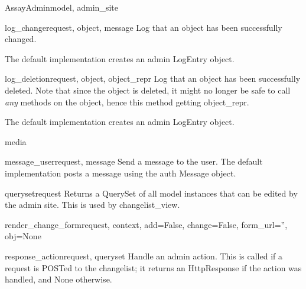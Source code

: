 \documentclass[letterpaper,10pt,english]{sphinxmanual}
\begin{document}
\begin{classdesc}{AssayAdmin}{model, admin\_site}
\hypertarget{data.admin.AssayAdmin.log_change}{}\begin{methoddesc}{log\_change}{request, object, message}
Log that an object has been successfully changed.

The default implementation creates an admin LogEntry object.
\end{methoddesc}

\hypertarget{data.admin.AssayAdmin.log_deletion}{}\begin{methoddesc}{log\_deletion}{request, object, object\_repr}
Log that an object has been successfully deleted. Note that since the
object is deleted, it might no longer be safe to call \emph{any} methods
on the object, hence this method getting object\_repr.

The default implementation creates an admin LogEntry object.
\end{methoddesc}

\hypertarget{data.admin.AssayAdmin.media}{}\begin{memberdesc}{media}\end{memberdesc}

\hypertarget{data.admin.AssayAdmin.message_user}{}\begin{methoddesc}{message\_user}{request, message}
Send a message to the user. The default implementation
posts a message using the auth Message object.
\end{methoddesc}

\hypertarget{data.admin.AssayAdmin.queryset}{}\begin{methoddesc}{queryset}{request}
Returns a QuerySet of all model instances that can be edited by the
admin site. This is used by changelist\_view.
\end{methoddesc}

\hypertarget{data.admin.AssayAdmin.render_change_form}{}\begin{methoddesc}{render\_change\_form}{request, context, add=False, change=False, form\_url='', obj=None}\end{methoddesc}

\hypertarget{data.admin.AssayAdmin.response_action}{}\begin{methoddesc}{response\_action}{request, queryset}
Handle an admin action. This is called if a request is POSTed to the
changelist; it returns an HttpResponse if the action was handled, and
None otherwise.
\end{methoddesc}


\end{classdesc}
\end{document}
